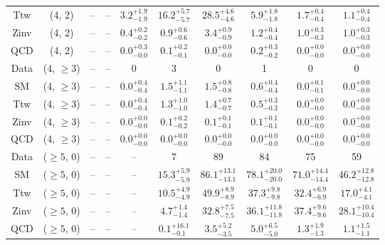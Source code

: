 \begin{table}[h!]
{\begin{tabular}{cccccccccc}
	Ttw & (4, 2) & -- & -- & $3.2^{+ 1.9 }_{- 1.9 }$ & $16.2^{+ 5.7 }_{- 5.7 }$ & $28.5^{+ 4.6 }_{- 4.6 }$ & $5.9^{+ 1.8 }_{- 1.8 }$ & $1.7^{+ 0.4 }_{- 0.4 }$ & $1.1^{+ 0.4 }_{- 0.4 }$ \\[0.5ex] 
	Zinv & (4, 2) & -- & -- & $0.4^{+ 0.2 }_{- 0.2 }$ & $0.9^{+ 0.6 }_{- 0.6 }$ & $3.4^{+ 0.9 }_{- 0.9 }$ & $1.2^{+ 0.4 }_{- 0.4 }$ & $1.0^{+ 0.3 }_{- 0.3 }$ & $1.0^{+ 0.3 }_{- 0.3 }$ \\[0.5ex] 
	QCD & (4, 2) & -- & -- & $0.0^{+ 0.3 }_{- 0.0 }$ & $0.1^{+ 0.2 }_{- 0.1 }$ & $0.0^{+ 0.0 }_{- 0.0 }$ & $0.2^{+ 0.3 }_{- 0.2 }$ & $0.0^{+ 0.0 }_{- 0.0 }$ & $0.0^{+ 0.0 }_{- 0.0 }$ \\[0.5ex] 
	Data & (4, $\ge3$) & -- & -- & 0 & 3 & 0 & 1 & 0 & 0 \\[0.5ex] 
	SM & (4, $\ge3$) & -- & -- & $0.0^{+ 0.4 }_{- 0.4 }$ & $1.5^{+ 1.1 }_{- 1.1 }$ & $1.5^{+ 0.8 }_{- 0.8 }$ & $0.6^{+ 0.4 }_{- 0.4 }$ & $0.0^{+ 0.1 }_{- 0.1 }$ & $0.0^{+ 0.0 }_{- 0.0 }$ \\[0.5ex] 
	Ttw & (4, $\ge3$) & -- & -- & $0.0^{+ 0.4 }_{- 0.4 }$ & $1.3^{+ 1.0 }_{- 1.0 }$ & $1.4^{+ 0.7 }_{- 0.7 }$ & $0.5^{+ 0.3 }_{- 0.3 }$ & $0.0^{+ 0.0 }_{- 0.0 }$ & $0.0^{+ 0.0 }_{- 0.0 }$ \\[0.5ex] 
	Zinv & (4, $\ge3$) & -- & -- & $0.0^{+ 0.0 }_{- 0.0 }$ & $0.1^{+ 0.2 }_{- 0.2 }$ & $0.1^{+ 0.1 }_{- 0.1 }$ & $0.1^{+ 0.1 }_{- 0.1 }$ & $0.0^{+ 0.0 }_{- 0.0 }$ & $0.0^{+ 0.0 }_{- 0.0 }$ \\[0.5ex] 
	QCD & (4, $\ge3$) & -- & -- & $0.0^{+ 0.0 }_{- 0.0 }$ & $0.0^{+ 0.0 }_{- 0.0 }$ & $0.0^{+ 0.0 }_{- 0.0 }$ & $0.0^{+ 0.0 }_{- 0.0 }$ & $0.0^{+ 0.0 }_{- 0.0 }$ & $0.0^{+ 0.0 }_{- 0.0 }$ \\[0.5ex] 
	Data & ($\ge5$, 0) & -- & -- & -- & 7 & 89 & 84 & 75 & 59 \\[0.5ex] 
	SM & ($\ge5$, 0) & -- & -- & -- & $15.3^{+ 5.9 }_{- 5.9 }$ & $86.1^{+ 13.1 }_{- 13.1 }$ & $78.1^{+ 20.0 }_{- 20.0 }$ & $71.0^{+ 14.4 }_{- 14.4 }$ & $46.2^{+ 12.8 }_{- 12.8 }$ \\[0.5ex] 
	Ttw & ($\ge5$, 0) & -- & -- & -- & $10.5^{+ 4.9 }_{- 4.9 }$ & $49.9^{+ 8.9 }_{- 8.9 }$ & $37.3^{+ 9.8 }_{- 9.8 }$ & $32.4^{+ 6.9 }_{- 6.9 }$ & $17.0^{+ 4.1 }_{- 4.1 }$ \\[0.5ex] 
	Zinv & ($\ge5$, 0) & -- & -- & -- & $4.7^{+ 1.4 }_{- 1.4 }$ & $32.8^{+ 7.5 }_{- 7.5 }$ & $36.1^{+ 11.8 }_{- 11.8 }$ & $37.4^{+ 9.6 }_{- 9.6 }$ & $28.1^{+ 10.4 }_{- 10.4 }$ \\[0.5ex] 
	QCD & ($\ge5$, 0) & -- & -- & -- & $0.1^{+ 16.1 }_{- 0.1 }$ & $3.5^{+ 5.2 }_{- 3.5 }$ & $5.0^{+ 6.5 }_{- 5.0 }$ & $1.3^{+ 1.9 }_{- 1.3 }$ & $1.1^{+ 1.5 }_{- 1.1 }$ \\[0.5ex] 

\end{tabular}}
\end{table}
